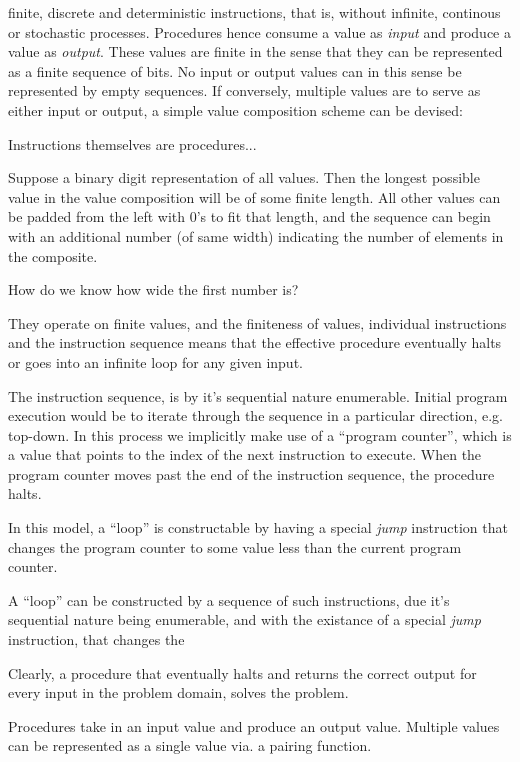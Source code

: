 finite, discrete and deterministic instructions, that is,
without infinite, continous or stochastic processes. Procedures hence consume a
value as \emph{input} and produce a value as \emph{output}. These values are
finite in the sense that they can be represented as a finite sequence of bits.
No input or output values can in this sense be represented by empty sequences.
If conversely, multiple values are to serve as either input or output, a simple
value composition scheme can be devised:

Instructions themselves are procedures...

Suppose a binary digit representation of all values. Then the longest possible
value in the value composition will be of some finite length. All other values
can be padded from the left with $0$'s to fit that length, and the sequence can
begin with an additional number (of same width) indicating the number of
elements in the composite.

How do we know how wide the first number is?

They operate on finite
values, and the finiteness of values, individual instructions and the
instruction sequence means that the effective procedure eventually halts or
goes into an infinite loop for any given input. 

The instruction sequence, is by it's sequential nature enumerable. Initial
program execution would be to iterate through the sequence in a particular
direction, e.g. top-down. In this process we implicitly make use of a ``program
counter'', which is a value that points to the index of the next instruction to
execute. When the program counter moves past the end of the instruction
sequence, the procedure halts.

In this model, a ``loop'' is constructable by having a special \emph{jump}
instruction that changes the program counter to some value less than the
current program counter.

A ``loop'' can be constructed by a sequence of such instructions, due it's
sequential nature being enumerable, and with the existance of a special
\emph{jump} instruction, that changes the 

Clearly, a procedure that eventually halts and returns the correct output for
every input in the problem domain, solves the problem.


Procedures take in an input value and produce an output value. Multiple values
can be represented as a single value via. a pairing function.



